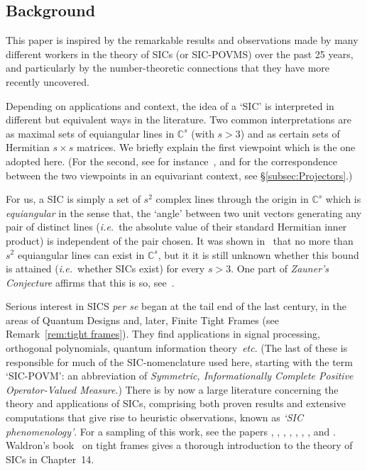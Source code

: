 \documentclass[12pt]{article}
\newcommand{\bbC}{\ensuremath{\mathbb{C}}}\newcommand{\bbCp}{\ensuremath{\mathbb{C}_p}}
\newcommand{\ie}{{\em i.e.}}
\begin{document}
\subsection{Background}
This paper is inspired by the remarkable results and observations made by many different workers in the theory of SICs (or SIC-POVMS) over the past 25 years, and particularly by the number-theoretic connections that they have more recently uncovered. 

Depending on applications and context, the idea of a `SIC' is interpreted in different but equivalent ways in the literature. Two common interpretations are as maximal sets of equiangular lines in $\bbC^s$ (with $s>3$) and as certain sets of Hermitian $s\times s$ matrices. We briefly explain the first viewpoint which is the one adopted here. (For the second, see for instance~\cite{Kopp IMRN}, and for the correspondence between the two viewpoints in an equivariant context, see \S\ref{subsec:Projectors}.) 

For us, a SIC is simply a set of $s^2$ complex lines through the origin in $\bbC^s$ which is \textit{equiangular}   
in the sense that, the `angle' between two unit vectors generating any pair of distinct lines (\ie\ the absolute value of their standard Hermitian inner product) is independent of the pair chosen. It was shown in~\cite{Delsarte et al} that no more than $s^2$ equiangular lines can exist in $\bbC^s$, but it it is still unknown whether this bound is attained (\ie\ whether SICs exist) for every $s>3$. One part of \textit{Zauner's Conjecture} affirms that this is so, see~\cite{Zauner}.  

Serious interest in SICS \textit{per se} began at the tail end of the last century, in  the areas of Quantum Designs and, later, Finite Tight Frames (see Remark~\ref{rem:tight frames}). They find applications in signal processing, orthogonal polynomials, quantum information theory~\textit{etc}. (The last of these is responsible for much of the SIC-nomenclature used here, starting with the term `SIC-POVM': an abbreviation of \textit{Symmetric, Informationally Complete Positive Operator-Valued Measure}.) There is by now a large literature concerning the theory and applications of SICs, comprising both proven results and extensive computations that give rise to heuristic observations, known as \textit{`SIC phenomenology'}. For a sampling of this work, see the papers 
\cite{ABGHM},
\cite{Appleby Flammia McC Yard}, 
\cite{DMA: SICPOVMs and the ECG}, 
\cite{Gal Auts Appleby et al}, 
\cite{Bengtsson Grass McC}, 
\cite{Horodecki et al}, 
\cite{Kopp IMRN}, 
and \cite{Zauner}. 
Waldron's book~\cite{Waldron's book} on tight frames gives a thorough introduction to the theory of SICs in Chapter~14.
\end{document}
